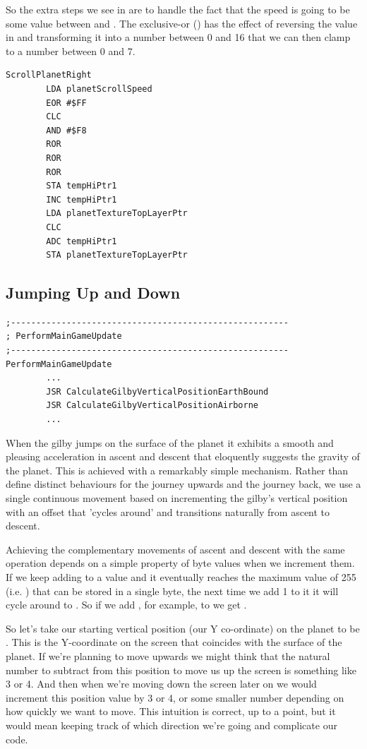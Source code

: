 So the extra steps we see in  are to handle the fact that the speed is going to be some value
between  and . The exclusive-or () has the effect of reversing the value in 
and transforming it into a number between 0 and 16 that we can then clamp to a number between 0 and 7.


\begin{lstlisting}
ScrollPlanetRight   
        LDA planetScrollSpeed
        EOR #$FF
        CLC
        AND #$F8
        ROR
        ROR
        ROR
        STA tempHiPtr1
        INC tempHiPtr1
        LDA planetTextureTopLayerPtr
        CLC
        ADC tempHiPtr1
        STA planetTextureTopLayerPtr
\end{lstlisting}


\subsection{Jumping Up and Down}
\begin{lstlisting}[caption=The routines responsible for updating the Gilby's vertical position.]
;-------------------------------------------------------
; PerformMainGameUpdate
;-------------------------------------------------------
PerformMainGameUpdate
        ...
        JSR CalculateGilbyVerticalPositionEarthBound
        JSR CalculateGilbyVerticalPositionAirborne
        ...

\end{lstlisting}
When the gilby jumps on the surface of the planet it exhibits a smooth and pleasing acceleration in ascent and descent that
eloquently suggests the gravity of the planet. This is achieved with a remarkably simple mechanism. Rather than define
distinct behaviours for the journey upwards and the journey back, we use a single continuous movement based on incrementing
the gilby's vertical position with an offset that 'cycles around' and transitions naturally from ascent to descent.

Achieving the complementary movements of ascent and descent with the same operation depends on a simple property of byte values when we increment them. If we keep adding
to a value and it eventually reaches the maximum value of 255 (i.e. ) that can be stored in a single byte,
 the next time we add 1 to it it will cycle around to . So if we add , for example, to  
 we get . 

So let's take our starting vertical position (our Y co-ordinate) on the planet to be . This is the Y-coordinate on the
screen that coincides with the surface of the planet. If we're planning to move upwards we might think that the natural number
to subtract from this position to move us up the screen is something like 3 or 4. And then when we're moving down the screen later
on we would increment this position value by 3 or 4, or some smaller number depending on how quickly we want to move. This intuition
is correct, up to a point, but it would mean keeping track of which direction we're going and complicate our code.

